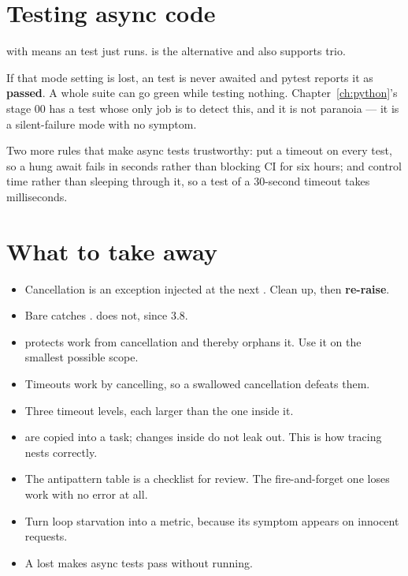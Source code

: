 \section{Testing async code}
\label{sec:testing-async}

 with  means an
 test just runs.  is the alternative and also
supports trio.

\begin{warning}
If that mode setting is lost, an  test is never awaited and
pytest reports it as \textbf{passed}. A whole suite can go green while testing
nothing. Chapter~\ref{ch:python}'s stage 00 has a test whose only job is to
detect this, and it is not paranoia --- it is a silent-failure mode with no
symptom.
\end{warning}

Two more rules that make async tests trustworthy: put a timeout on every test, so
a hung await fails in seconds rather than blocking CI for six hours; and control
time rather than sleeping through it, so a test of a 30-second timeout takes
milliseconds.

\section{What to take away}
\label{sec:ch4-summary}

\begin{itemize}[leftmargin=1.4em]
\item Cancellation is an exception injected at the next . Clean up,
      then \textbf{re-raise}.
\item Bare  catches . 
      does not, since 3.8.
\item {} protects work from cancellation and thereby orphans it. Use
      it on the smallest possible scope.
\item Timeouts work by cancelling, so a swallowed cancellation defeats them.
\item Three timeout levels, each larger than the one inside it.
\item {} are copied into a task; changes inside do not leak out.
      This is how tracing nests correctly.
\item The antipattern table is a checklist for review. The fire-and-forget one
      loses work with no error at all.
\item Turn loop starvation into a metric, because its symptom appears on
      innocent requests.
\item A lost  makes async tests pass without running.
\end{itemize}

